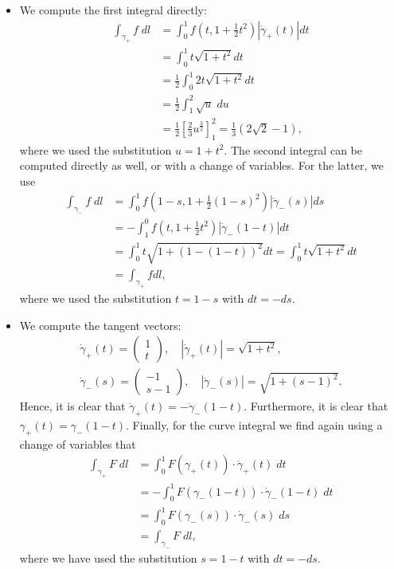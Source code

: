 \documentclass[11pt]{article}
\begin{document}
\begin{solution}
    \begin{itemize}
		\item We compute the first integral directly:
		\begin{align*}
			\int_{\gamma_+} f \;dl
			&=
			\int_{0}^1 f( t, 1 + \frac 1 2 t^2 ) |\dot{\gamma}_+(t)|dt
			\\&
			=
			\int_{0}^1 t \sqrt{ 1 + t^2 } dt
			\\&
			=
			\frac 1 2 \int_{0}^1 2t \sqrt{ 1 + t^2 } dt
			\\&
			=
			\frac 1 2 \int_1^2 \sqrt{ u } \;du\\&
			=
			\frac 1 2 \left[ \frac 2 3 u^{\frac 3 2} \right]_1^2 = \frac 1 3 \left( 2 \sqrt{2} - 1 \right),
		\end{align*}
		where we used the substitution $u = 1 + t^2$.
		The second integral can be computed directly as well, or with a change of variables. For the latter, we use
		\begin{align*}
			\int_{\gamma_-} f \;dl
			&=
			\int_{0}^1 f( 1 - s, 1 + \frac 1 2 (1 - s)^2 ) |\dot{\gamma}_-(s)|ds
			\\&
			=-\int_1^0 f(t, 1 + \frac 1 2 t^2) |\dot{\gamma}_-(1-t)|dt
			\\&
			= \int_0^1 t \sqrt{1 + (1 - (1 - t))^2} dt = \int_0^1 t \sqrt{1 + t^2} dt
			\\&
			= \int_{\gamma_+}f dl,
		\end{align*}
		where we used the substitution $t = 1 - s$ with $dt = -ds$.

        \item We compute the tangent vectors:
        \begin{align*}
            \dot\gamma_+(t) = \begin{pmatrix} 1 \\ t \end{pmatrix}, \quad |\dot \gamma_+(t)| = \sqrt{1 + t^2},
            \\
            \dot\gamma_-(s) = \begin{pmatrix} -1 \\ s - 1 \end{pmatrix}, \quad |\dot \gamma_-(s)| = \sqrt{1 + (s-1)^2}.
        \end{align*}
        Hence, it is clear that $\dot\gamma_+(t) = - \dot\gamma_-(1-t)$. Furthermore, it is clear that $\gamma_+(t) = \gamma_-(1 - t)$. Finally, for the curve integral we find again using a change of variables that
        \begin{align*}
            \int_{\gamma_+} F \;dl &= \int_0^1 F(\gamma_+(t)) \cdot \dot\gamma_+(t) \;dt
            \\&
            = -\int_0^1 F(\gamma_-(1 - t)) \cdot \dot\gamma_-(1 - t) \;dt
            \\&
            = \int_0^1 F(\gamma_-(s)) \cdot \dot\gamma_-(s) \;ds
            \\&
            = \int_{\gamma_-} F \;dl,
        \end{align*}
        where we have used the substitution $s = 1 - t$ with $dt = -ds$.
    \end{itemize}
\end{solution}
\end{document}
